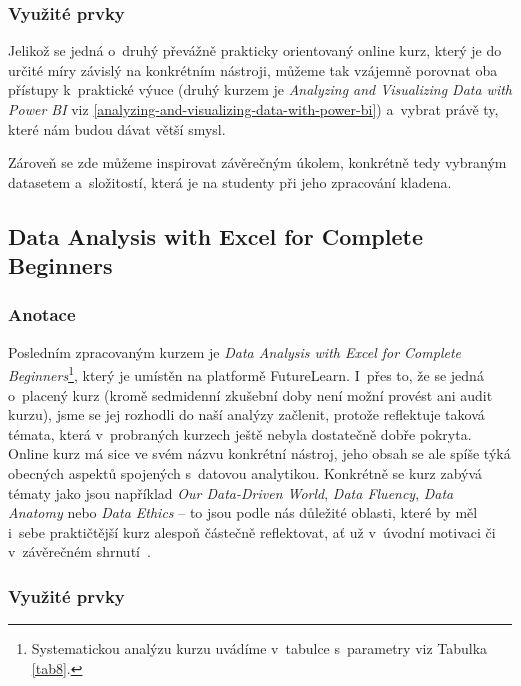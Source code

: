 \hypertarget{vyuux17eituxe9-prvky-6}{%
\subsubsection{Využité prvky}\label{vyuux17eituxe9-prvky-6}}

Jelikož se jedná o~druhý převážně prakticky orientovaný online kurz, který je do určité míry závislý na konkrétním nástroji, můžeme tak vzájemně porovnat oba přístupy k~praktické výuce (druhý kurzem je \emph{Analyzing and Visualizing Data with Power BI} viz \ref{analyzing-and-visualizing-data-with-power-bi}) a~vybrat právě ty, které nám budou dávat větší smysl.

Zároveň se zde můžeme inspirovat závěrečným úkolem, konkrétně tedy vybraným datasetem a~složitostí, která je na studenty při jeho zpracování kladena.

\hypertarget{data-analysis-with-excel-for-complete-beginners}{%
\subsection{Data Analysis with Excel for Complete Beginners}\label{data-analysis-with-excel-for-complete-beginners}}

\hypertarget{anotace-6}{%
\subsubsection{Anotace}\label{anotace-6}}

Posledním zpracovaným kurzem je \emph{Data Analysis with Excel for Complete Beginners}\footnote{Systematickou analýzu kurzu uvádíme v~tabulce s~parametry viz Tabulka \ref{tab8}.}, který je umístěn na platformě FutureLearn. I~přes to, že se jedná o~placený kurz (kromě sedmidenní zkušební doby není možní provést ani audit kurzu), jsme se jej rozhodli do naší analýzy začlenit, protože reflektuje taková témata, která v~probraných kurzech ještě nebyla dostatečně dobře pokryta. Online kurz má sice ve svém názvu konkrétní nástroj, jeho obsah se ale spíše týká obecných aspektů spojených s~datovou analytikou. Konkrétně se kurz zabývá tématy jako jsou například \emph{Our Data-Driven World}, \emph{Data Fluency}, \emph{Data Anatomy} nebo \emph{Data Ethics} -- to jsou podle nás důležité oblasti, které by měl i~sebe praktičtější kurz alespoň částečně reflektovat, ať už v~úvodní motivaci či v~závěrečném shrnutí~\parencite{course8}.

\hypertarget{vyuux17eituxe9-prvky-7}{%
\subsubsection{Využité prvky}\label{vyuux17eituxe9-prvky-7}}

